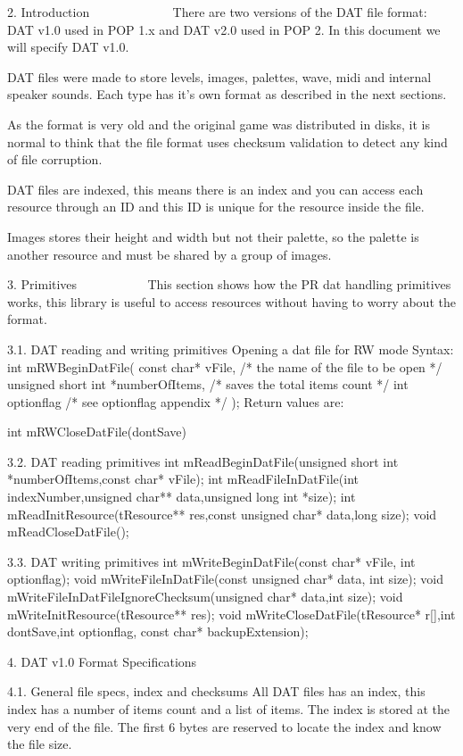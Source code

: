 2. Introduction
   ~~~~~~~~~~~~
 There are two versions of the DAT file format: DAT v1.0 used in POP 1.x
 and DAT v2.0 used in POP 2. In this document we will specify DAT v1.0.

 DAT files were made to store levels, images, palettes, wave, midi and
 internal speaker sounds. Each type has it's own format as described in
 the next sections.
 
 As the format is very old and the original game was distributed in disks,
 it is normal to think that the file format uses checksum validation to
 detect any kind of file corruption.

 DAT files are indexed, this means there is an index and you can access
 each resource through an ID and this ID is unique for the resource inside
 the file.

 Images stores their height and width but not their palette, so the palette
 is another resource and must be shared by a group of images.

3. Primitives
   ~~~~~~~~~~
 This section shows how the PR dat handling primitives works, this library
 is useful to access resources without having to worry about the format.

3.1. DAT reading and writing primitives
 Opening a dat file for RW mode
 Syntax:
 int mRWBeginDatFile(
  const char* vFile, /* the name of the file to be open */
  unsigned short int *numberOfItems, /* saves the total items count */
  int optionflag /* see optionflag appendix */
 );
 Return values are:

 int mRWCloseDatFile(dontSave)

3.2. DAT reading primitives
 int  mReadBeginDatFile(unsigned short int *numberOfItems,const char* vFile);
 int  mReadFileInDatFile(int indexNumber,unsigned char** data,unsigned long
      int *size);
 int  mReadInitResource(tResource** res,const unsigned char* data,long size);
 void mReadCloseDatFile();

3.3. DAT writing primitives
 int  mWriteBeginDatFile(const char* vFile, int optionflag);
 void mWriteFileInDatFile(const unsigned char* data, int size);
 void mWriteFileInDatFileIgnoreChecksum(unsigned char* data,int size);
 void mWriteInitResource(tResource** res);
 void mWriteCloseDatFile(tResource* r[],int dontSave,int optionflag, const
      char* backupExtension);

4. DAT v1.0 Format Specifications
   ~~~ ~~~~ ~~~~~~ ~~~~~~~~~~~~~~

4.1. General file specs, index and checksums
 All DAT files has an index, this index has a number of items count and
 a list of items.
 The index is stored at the very end of the file.
 The first 6 bytes are reserved to locate the index and know the file size.

